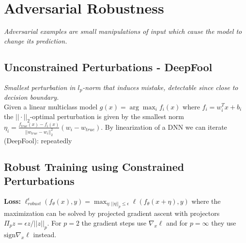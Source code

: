 \color{black}
\section*{Adversarial Robustness}
\textit{Adversarial examples are small manipulations of input which cause the model to change its prediction.}\\
\subsection*{Unconstrained Perturbations - DeepFool}
\textit{Smallest perturbation in $l_p$-norm that induces mistake, detectable since close to decision boundary.}\\

Given a linear multiclass model $g(x) = \arg \max_i f_i(x)$ where $ f_i = w_i^T x + b_i$ the $||\cdot||_2$-optimal perturbation is given by the smallest norm $\eta_i = \frac{f_{true}(x) - f_i(x)}{||w_{true} - w_i||_2^2} (w_i - w_{true})$. By linearization of a DNN we can iterate (DeepFool): repeatedly


\subsection*{Robust Training using Constrained Perturbations}
\textbf{Loss:} $\ell_{robust}^\epsilon(f_\theta(x), y) = \max_{\eta : ||\eta||_p \leq \epsilon} \ell(f_\theta(x+\eta), y)$ where the maximization can be solved by projected gradient ascent with projectors $\Pi_p z = \epsilon z/||z||_p$. For $p=2$ the gradient steps use $\nabla_x \ell$ and for $p=\infty$ they use $\text{sign}\nabla_x \ell$ instead.
